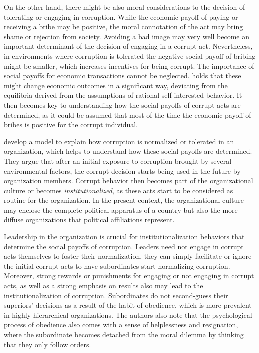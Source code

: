 \documentclass[12pt,a4]{article}\usepackage[]{graphicx}\usepackage[]{xcolor}
\begin{document}
On the other hand, there might be also moral considerations to the decision of tolerating or engaging in corruption. While the economic payoff of paying or receiving a bribe may be positive, the moral connotation of the act may bring shame or rejection from society. Avoiding a bad image may very well become an important determinant of the decision of engaging in a corrupt act. Nevertheless, in environments where corruption is tolerated the negative social payoff of bribing might be smaller, which increases incentives for being corrupt. The importance of social payoffs for economic transactions cannot be neglected. \textcite{Akerlof.1980} holds that these might change economic outcomes in a significant way, deviating from the equilibria derived from the assumptions of rational self-interested behavior. It then becomes key to understanding how the social payoffs of corrupt acts are determined, as it could be assumed that most of the time the economic payoff of bribes is positive for the corrupt individual. 

\textcite{Ashforth.2003} develop a model to explain how corruption is normalized or tolerated in an organization, which helps to understand how these social payoffs are determined. They argue that after an initial exposure to corruption brought by several environmental factors, the corrupt decision starts being used in the future by organization members. Corrupt behavior then becomes part of the organizational culture or becomes \textit{institutionalized}, as these acts start to be considered as routine for the organization. In the present context, the organizational culture may enclose the complete political apparatus of a country but also the more diffuse organizations that political affiliations represent. 

Leadership in the organization is crucial for institutionalization behaviors that determine the social payoffs of corruption. Leaders need not engage in corrupt acts themselves to foster their normalization, they can simply facilitate or ignore the initial corrupt acts to have subordinates start normalizing corruption. Moreover, strong rewards or punishments for engaging or not engaging in corrupt acts, as well as a strong emphasis on results also may lead to the institutionalization of corruption. Subordinates do not second-guess their superiors' decisions as a result of the habit of obedience, which is more prevalent in highly hierarchical organizations. The authors also note that the psychological process of obedience also comes with a sense of helplessness and resignation, where the subordinate becomes detached from the moral dilemma by thinking that they only follow orders. 
\end{document}
